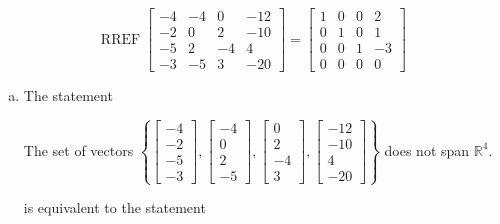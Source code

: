 \begin{exerciseAnswer} 


\[\operatorname{RREF} \left[\begin{array}{cccc}
-4 & -4 & 0 & -12 \\
-2 & 0 & 2 & -10 \\
-5 & 2 & -4 & 4 \\
-3 & -5 & 3 & -20
\end{array}\right] = \left[\begin{array}{cccc}
1 & 0 & 0 & 2 \\
0 & 1 & 0 & 1 \\
0 & 0 & 1 & -3 \\
0 & 0 & 0 & 0
\end{array}\right] \]


\begin{enumerate}[(a)]
\item The statement 
\begin{center}\begin{minipage}{0.8\textwidth}
 The set of vectors \( \left\{ \left[\begin{array}{c}
-4 \\
-2 \\
-5 \\
-3
\end{array}\right] , \left[\begin{array}{c}
-4 \\
0 \\
2 \\
-5
\end{array}\right] , \left[\begin{array}{c}
0 \\
2 \\
-4 \\
3
\end{array}\right] , \left[\begin{array}{c}
-12 \\
-10 \\
4 \\
-20
\end{array}\right] \right\} \) does not span \(\mathbb{R}^4\). 
\end{minipage}\end{center}
     is equivalent to the statement 
\begin{center}\begin{minipage}{0.8\textwidth}
 The vector equation \( x_{1} \left[\begin{array}{c}
-4 \\
-2 \\

\end{array}
\end{minipage}
\end{center}
\end{enumerate}
\end{exerciseAnswer}

